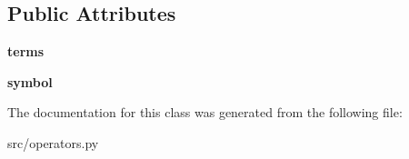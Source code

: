 \subsection*{Public Attributes}
\begin{DoxyCompactItemize}
\item 
\mbox{\label{classsrc_1_1operators_1_1HomogenOperator_a3bb9a878e36a36cc1131c809ddc4cb0d}} 
{\bfseries terms}
\item 
\mbox{\label{classsrc_1_1operators_1_1HomogenOperator_a86b81332395e1f3663fb1dd04a8e5640}} 
{\bfseries symbol}
\end{DoxyCompactItemize}


The documentation for this class was generated from the following file\+:\begin{DoxyCompactItemize}
\item 
src/operators.\+py\end{DoxyCompactItemize}
